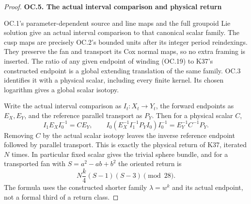 \begin{proof}
\par

\medskip\noindent\textbf{OC.5. The actual interval comparison and physical return}

\par\nobreak

OC.1's parameter-dependent source and line maps and the full
groupoid Lie solution give an actual interval comparison to that
canonical scalar family. The cusp maps are precisely OC.2's bounded
units after its integer period reindexings. They preserve the fan
and transport its Cox normal maps, so no extra framing is inserted.
The ratio of any given endpoint of winding (OC.19) to K37's
constructed endpoint is a global extending translation of the same
family. OC.3 identifies it with a physical scalar, including every
finite kernel. Its chosen logarithm gives a global scalar isotopy.

Write the actual interval comparison as \(I_t:X_t\to Y_t\),
the forward endpoints as \(E_X,E_Y\), and the reference parallel
transport as \(P_Y\). Then for a physical scalar \(C\),
\[
 I_1E_XI_0^{-1}=C E_Y,\qquad
 I_0(E_X^{-1}I_1^{-1}P_YI_0)I_0^{-1}
                  =E_Y^{-1}C^{-1}P_Y.                   \tag{OC.21}
\]
Removing \(C\) by the actual scalar isotopy leaves the inverse
reference endpoint followed by parallel transport. This is exactly
the physical return of K37, iterated \(N\) times. In particular
fixed scalar gives the trivial sphere bundle, and for a transported
fan with \(S=a^2-ab+b^2\) the oriented return is
\[
                    N\frac{k}{4}(S-1)(S-3)\pmod{28}.     \tag{OC.22}
\]
The formula uses the constructed shorter family \(\lambda=w^k\)
and its actual endpoint, not a formal third of a return class.

\end{proof}
